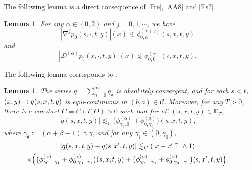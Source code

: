 \documentclass[11pt]{article}
\numberwithin{equation}{section}\providecommand{\asymp}{\mathrel{\sim}}
\def\mto{\mathchoice{\longmapsto}{\mapsto}{\mapsto}{\mapsto}}
\theoremstyle{plain}
\newtheorem{lemma}[theorem]{Lemma}
\theoremstyle{definition}
\newcommand\cD{{\mathcal D}}
\newcommand\mD{\mathbb{D}}
\newcommand\1{{\mathbf{1}}}
\newcommand\sC{{\mathscr C}}
\begin{document}
The following lemma is a direct consequence of \eqref{Fre}, \eqref{AA8} and \eqref{Es2}.
\begin{lemma} \label{LEMMA_BD_PROXY}
For any $\alpha\in(0,2)$ and $j=0,1,\cdots$, we have
\begin{equation}\label{Eq19}
|\nabla^j p_0(s,\cdot,t,y)|(x)\lesssim \phi^{(\alpha+j)}_{0,\alpha}(s,x,t,y)
\end{equation}
and
\begin{equation}\label{Eq20}
|\cD^{(\alpha)} p_0(s,\cdot,t,y)|(x)\lesssim \phi^{(\alpha)}_{0,0}(s,x,t,y).
\end{equation}
\end{lemma}
The following lemma corresponds to \cite[Th.\,3.1]{Ch-Zh}.
\begin{lemma}\label{Le31}
The series $q=\sum_{n=0}^\infty q_n$
is absolutely convergent, and for each $s<t$, $(x,y)\mto q(s,x,t,y)$
is equi-continuous in $(b,a)\in\sC$. Moreover, for any $T>0$, there is a constant $C=C(T,\Theta)>0$
such that for all $(s,x,t,y)\in\mD_T$,
\begin{equation}\label{G7}
|q(s,x,t,y)|\lesssim_C\bigl(\phi^{(\alpha)}_{\gamma_0,0}+\phi^{(\alpha)}_{0,\gamma_0}\bigr)(s,x,t,y),
\end{equation}
where $\gamma_0:=(\alpha+\beta-1)\wedge\gamma$, and for any $\gamma_1\in(0,\gamma_0)$,
\begin{multline}\label{G8}
|q(s,x,t,y)-q(s,x',t,y)|\lesssim_C(|x-x'|^{\gamma_1}\wedge1)
\\
\times\Bigl(\bigl(\phi^{(\alpha)}_{\gamma_0,-\gamma_1}+\phi^{(\alpha)}_{0,\gamma_0-\gamma_1}\bigr)(s,x,t,y)
+\bigl(\phi^{(\alpha)}_{\gamma_0,-\gamma_1}+\phi^{(\alpha)}_{0,\gamma_0-\gamma_1}\bigr)(s,x',t,y)\Bigr).
\end{multline}
\end{lemma}
\end{document}
